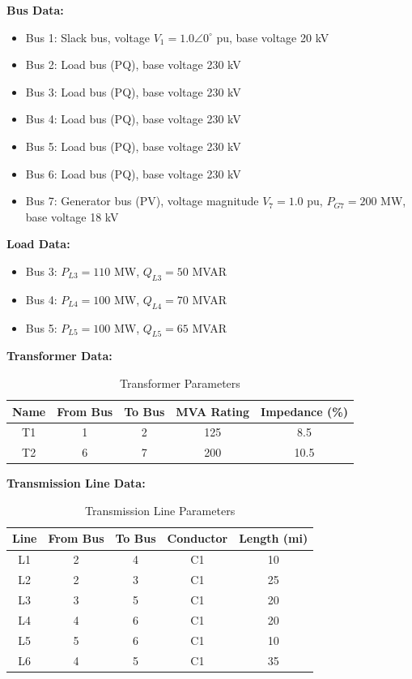 \documentclass{article}
\begin{document}
	\noindent \textbf{Bus Data:}
	\begin{itemize}
		\item Bus 1: Slack bus, voltage $V_1 = 1.0 \angle 0^\circ$ pu, base voltage 20 kV
		\item Bus 2: Load bus (PQ), base voltage 230 kV
		\item Bus 3: Load bus (PQ), base voltage 230 kV
		\item Bus 4: Load bus (PQ), base voltage 230 kV
		\item Bus 5: Load bus (PQ), base voltage 230 kV
		\item Bus 6: Load bus (PQ), base voltage 230 kV
		\item Bus 7: Generator bus (PV), voltage magnitude $V_7 = 1.0$ pu, $P_{G7} = 200$ MW, base voltage 18 kV
	\end{itemize}
	
	\noindent \textbf{Load Data:}
	\begin{itemize}
		\item Bus 3: $P_{L3} = 110$ MW, $Q_{L3} = 50$ MVAR
		\item Bus 4: $P_{L4} = 100$ MW, $Q_{L4} = 70$ MVAR
		\item Bus 5: $P_{L5} = 100$ MW, $Q_{L5} = 65$ MVAR
	\end{itemize}
	
	\noindent \textbf{Transformer Data:}
	\begin{table}[H]
		\centering
		\begin{tabular}{ccccc}
			\hline
			\textbf{Name} & \textbf{From Bus} & \textbf{To Bus} & \textbf{MVA Rating} & \textbf{Impedance (\%)} \\
			\hline
			T1 & 1 & 2 & 125 & 8.5 \\
			T2 & 6 & 7 & 200 & 10.5 \\
			\hline
		\end{tabular}
		\caption{Transformer Parameters}
		\label{tab:transformer_data}
	\end{table}
	
	\noindent \textbf{Transmission Line Data:}
	\begin{table}[H]
		\centering
		\begin{tabular}{ccccc}
			\hline
			\textbf{Line} & \textbf{From Bus} & \textbf{To Bus} & \textbf{Conductor} & \textbf{Length (mi)} \\
			\hline
			L1 & 2 & 4 & C1 & 10 \\
			L2 & 2 & 3 & C1 & 25 \\
			L3 & 3 & 5 & C1 & 20 \\
			L4 & 4 & 6 & C1 & 20 \\
			L5 & 5 & 6 & C1 & 10 \\
			L6 & 4 & 5 & C1 & 35 \\
			\hline
		\end{tabular}
		\caption{Transmission Line Parameters}
		\label{tab:line_data}
	\end{table}
	
\end{document}
